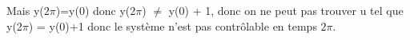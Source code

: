 \documentclass{article}
\begin{document}
    
    Mais y($2\pi$)=y(0) donc y(2$\pi$) $\neq$ y(0) + 1, donc on ne peut pas trouver u tel que y(2$\pi$) = y(0)+1 donc le système n'est pas contrôlable en temps $2\pi$.
\end{document}

